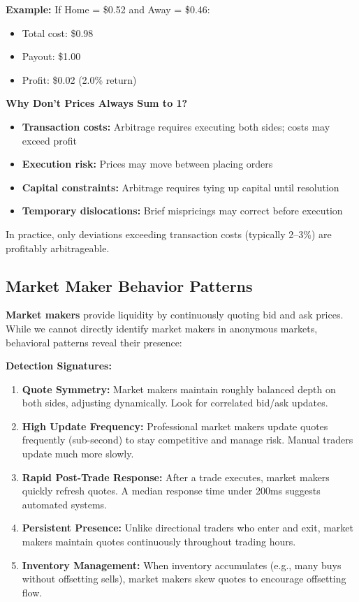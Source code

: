 \textbf{Example:} If Home = \$0.52 and Away = \$0.46:
\begin{itemize}
    \item Total cost: \$0.98
    \item Payout: \$1.00
    \item Profit: \$0.02 (2.0\% return)
\end{itemize}

\textbf{Why Don't Prices Always Sum to 1?}
\begin{itemize}
    \item \textbf{Transaction costs:} Arbitrage requires executing both sides; costs may exceed profit
    \item \textbf{Execution risk:} Prices may move between placing orders
    \item \textbf{Capital constraints:} Arbitrage requires tying up capital until resolution
    \item \textbf{Temporary dislocations:} Brief mispricings may correct before execution
\end{itemize}

In practice, only deviations exceeding transaction costs (typically 2--3\%) are profitably arbitrageable.

\subsection{Market Maker Behavior Patterns}
\label{method:mm-appendix}

\textbf{Market makers} provide liquidity by continuously quoting bid and ask prices. While we cannot directly identify market makers in anonymous markets, behavioral patterns reveal their presence:

\textbf{Detection Signatures:}
\begin{enumerate}
    \item \textbf{Quote Symmetry:} Market makers maintain roughly balanced depth on both sides, adjusting dynamically. Look for correlated bid/ask updates.

    \item \textbf{High Update Frequency:} Professional market makers update quotes frequently (sub-second) to stay competitive and manage risk. Manual traders update much more slowly.

    \item \textbf{Rapid Post-Trade Response:} After a trade executes, market makers quickly refresh quotes. A median response time under 200ms suggests automated systems.

    \item \textbf{Persistent Presence:} Unlike directional traders who enter and exit, market makers maintain quotes continuously throughout trading hours.

    \item \textbf{Inventory Management:} When inventory accumulates (e.g., many buys without offsetting sells), market makers skew quotes to encourage offsetting flow.
\end{enumerate}

